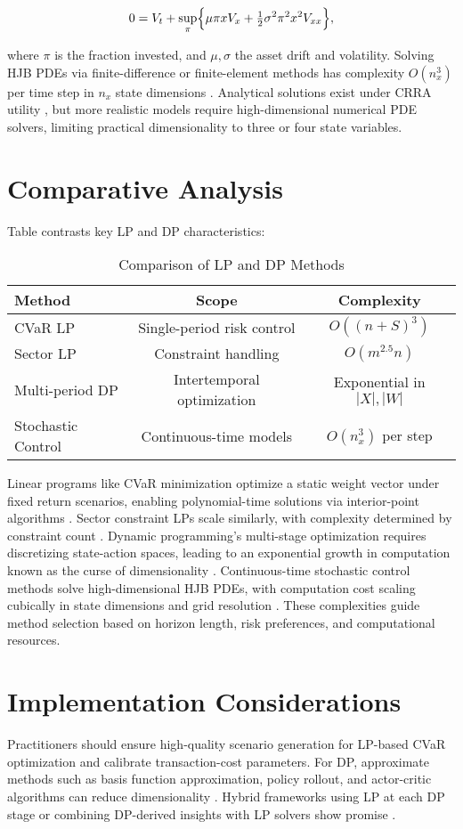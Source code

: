 \documentclass{article}
\begin{document}
$$
  0 = V_t + \sup_{\pi} \Bigl\{ \mu\pi x V_x + \tfrac12\sigma^2\pi^2 x^2 V_{xx} \Bigr\},
$$

where $\pi$ is the fraction invested, and $\mu,\sigma$ the asset drift and volatility. Solving HJB PDEs via finite-difference or finite-element methods has complexity $O(n_x^3)$ per time step in $n_x$ state dimensions \cite{forsyth1999}. Analytical solutions exist under CRRA utility \cite{merton1971}, but more realistic models require high-dimensional numerical PDE solvers, limiting practical dimensionality to three or four state variables.

\section{Comparative Analysis}
Table contrasts key LP and DP characteristics:
\begin{table}[h!]
\centering
\begin{tabular}{lcc}
\hline
Method & Scope & Complexity \\
\hline
CVaR LP & Single-period risk control & $O((n+S)^{3})$ \cite{wright1997} \\
Sector LP & Constraint handling & $O(m^{2.5}n)$ \cite{chvatal1983} \\
Multi-period DP & Intertemporal optimization & Exponential in $|X|,|W|$ \cite{bellman1957} \\
Stochastic Control & Continuous-time models & $O(n_x^3)$ per step \cite{forsyth1999} \\
\hline
\end{tabular}
\caption{Comparison of LP and DP Methods}
\label{tab\:compare}
\end{table}
Linear programs like CVaR minimization optimize a static weight vector under fixed return scenarios, enabling polynomial-time solutions via interior-point algorithms \cite{nemhauser1988}. Sector constraint LPs scale similarly, with complexity determined by constraint count \cite{chvatal1983}. Dynamic programming’s multi-stage optimization requires discretizing state-action spaces, leading to an exponential growth in computation known as the curse of dimensionality \cite{bellman1957,powell2011}. Continuous-time stochastic control methods solve high-dimensional HJB PDEs, with computation cost scaling cubically in state dimensions and grid resolution \cite{forsyth1999}. These complexities guide method selection based on horizon length, risk preferences, and computational resources.

\section{Implementation Considerations}
Practitioners should ensure high-quality scenario generation for LP-based CVaR optimization and calibrate transaction-cost parameters. For DP, approximate methods such as basis function approximation, policy rollout, and actor-critic algorithms can reduce dimensionality \cite{powell2011}. Hybrid frameworks using LP at each DP stage or combining DP-derived insights with LP solvers show promise \cite{hu2012}.
\end{document}
